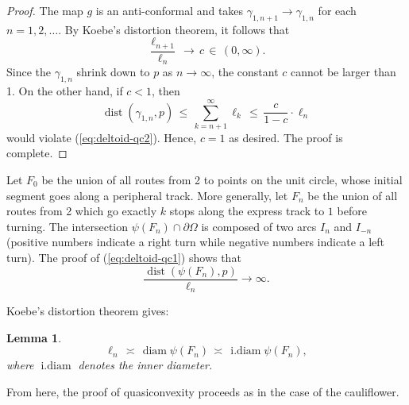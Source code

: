\documentclass[12pt]{article}
\numberwithin{equation}{section}
\newtheorem{lemma}[theorem]{Lemma}
\theoremstyle{remark}
\theoremstyle{definition}
\DeclareMathOperator{\diam}{diam}
\DeclareMathOperator{\idiam}{i.diam}
\DeclareMathOperator{\dist}{dist}
\begin{document}
\begin{proof}
The map $g$ is an anti-conformal and takes $\gamma_{1, n+1} \to \gamma_{1,n}$ for each $n = 1, 2, \dots$. By Koebe's distortion theorem, it follows  that
$$
\frac{\ell_{n+1}}{\ell_n} \, \to \, c \, \in \, (0,\infty).
$$
 Since the $\gamma_{1,n}$ shrink down to $p$ as $n \to \infty$, the constant $c$ cannot be larger than 1. On the other hand, if $c < 1$, then
$$
\dist(\gamma_{1,n}, p) \, \le \, \sum_{k = n+1}^\infty  \ell_{k} \,  \le  \,  \frac{c}{1-c} \cdot \ell_n
$$
would violate (\ref{eq:deltoid-qc2}). Hence, $c = 1$ as desired. The proof is complete.
\end{proof}

Let $F_0$ be the union of all routes from 2  to points on the unit circle, whose initial segment goes along a peripheral track. More generally, let $F_n$ be the union of all routes from 2 which go exactly $k$ stops along the express track to $1$ before turning.
The intersection $\psi(F_n) \cap \partial \Omega$ is composed of two arcs $I_n$ and $I_{-n}$ (positive numbers indicate a right turn while negative numbers indicate a left turn). The proof of (\ref{eq:deltoid-qc1}) shows that
\begin{equation}
\frac{\dist(\psi(F_n), p)}{\ell_{n}} \to \infty.
\end{equation}

Koebe's distortion theorem gives:

\begin{lemma}
\begin{equation}
\ell_n \,  \asymp \, \diam \psi(F_n) \, \asymp \, \idiam \psi(F_n),
\end{equation}
where $\idiam$ denotes the inner diameter.
\end{lemma}
From here, the proof of quasiconvexity proceeds as in the case of the cauliflower.
\end{document}
